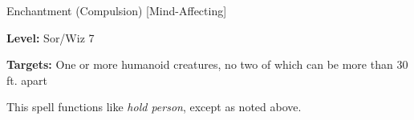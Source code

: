 
Enchantment (Compulsion) [Mind-Affecting]

\textbf{Level:} Sor/Wiz 7

\textbf{Targets:} One or more humanoid creatures, no two of which can be more than 
30 ft. apart

This spell functions like \textit{hold person}, except as noted above.

